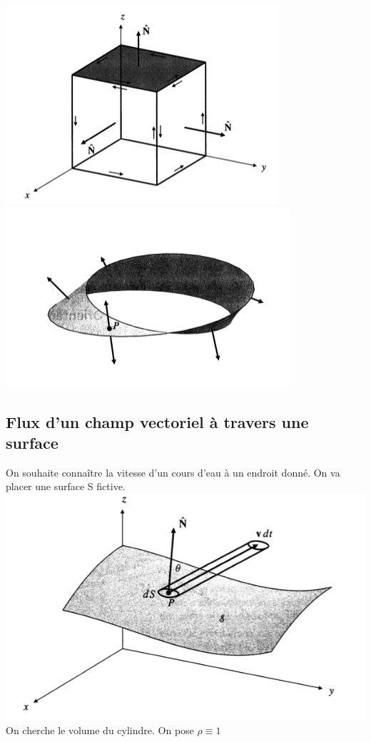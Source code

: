  \includegraphics[scale=0.6]{image7.png}\\
 \includegraphics[scale=0.6]{image8.png}

 \subsection{Flux d'un champ vectoriel à travers une surface}

 On souhaite connaître la vitesse d'un cours d'eau à un endroit donné. On va placer une surface S fictive.\\

 \includegraphics[scale=0.5]{image9.png} %
\\ On cherche le volume du cylindre. On pose $\rho \equiv 1$


